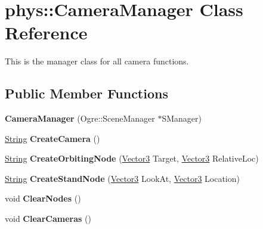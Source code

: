 \hypertarget{classphys_1_1CameraManager}{
\section{phys::CameraManager Class Reference}
\label{d9/d91/classphys_1_1CameraManager}
}


This is the manager class for all camera functions.  


\subsection*{Public Member Functions}
\begin{DoxyCompactItemize}
\item 
\hypertarget{classphys_1_1CameraManager_aff47d21e0c80b2b1b44148b0ec7de344}{
{\bfseries CameraManager} (Ogre::SceneManager $\ast$SManager)}
\label{d9/d91/classphys_1_1CameraManager_aff47d21e0c80b2b1b44148b0ec7de344}

\item 
\hypertarget{classphys_1_1CameraManager_ac6ff80c91fa5a2cd21ebd8b78db9add2}{
\hyperlink{namespacephys_aa03900411993de7fbfec4789bc1d392e}{String} {\bfseries CreateCamera} ()}
\label{d9/d91/classphys_1_1CameraManager_ac6ff80c91fa5a2cd21ebd8b78db9add2}

\item 
\hypertarget{classphys_1_1CameraManager_a9a696ea09f174a69bbc6d0bb179b3de4}{
\hyperlink{namespacephys_aa03900411993de7fbfec4789bc1d392e}{String} {\bfseries CreateOrbitingNode} (\hyperlink{classphys_1_1Vector3}{Vector3} Target, \hyperlink{classphys_1_1Vector3}{Vector3} RelativeLoc)}
\label{d9/d91/classphys_1_1CameraManager_a9a696ea09f174a69bbc6d0bb179b3de4}

\item 
\hypertarget{classphys_1_1CameraManager_ab5f9ca6b053670e69f5812cf573d5972}{
\hyperlink{namespacephys_aa03900411993de7fbfec4789bc1d392e}{String} {\bfseries CreateStandNode} (\hyperlink{classphys_1_1Vector3}{Vector3} LookAt, \hyperlink{classphys_1_1Vector3}{Vector3} Location)}
\label{d9/d91/classphys_1_1CameraManager_ab5f9ca6b053670e69f5812cf573d5972}

\item 
\hypertarget{classphys_1_1CameraManager_a42d91612bbaa00187944290d6bfd44e9}{
void {\bfseries ClearNodes} ()}
\label{d9/d91/classphys_1_1CameraManager_a42d91612bbaa00187944290d6bfd44e9}

\item 
\hypertarget{classphys_1_1CameraManager_a76bebee0820fcfa462412cb112b1b874}{
void {\bfseries ClearCameras} ()}
\label{d9/d91/classphys_1_1CameraManager_a76bebee0820fcfa462412cb112b1b874}


\end{DoxyCompactItemize}
